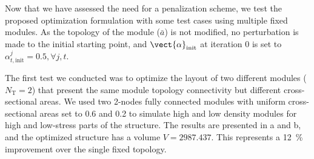 Now that we have assessed the need for a penalization scheme, we test the proposed optimization formulation with some test cases using multiple fixed modules. As the topology of the module ($\bar{a}$) is not modified, no perturbation is made to the initial starting point, and $\vect{\alpha}_\text{init}$ at iteration 0 is set to $\alpha_{t,\text{init}}^j = 0.5, \forall j, t$. 

The first test we conducted was to optimize the layout of two different modules ($N_\text{T}=2$) that present the same module topology connectivity but different cross-sectional areas. We used two 2-nodes fully connected modules with uniform cross-sectional areas set to 0.6 and 0.2 to simulate high and low density modules for high and low-stress parts of the structure. The results are presented in a and b, and the optimized structure has a volume $V = 2987.437$. This represents a \qty{12}{\%} improvement over the single fixed topology.

